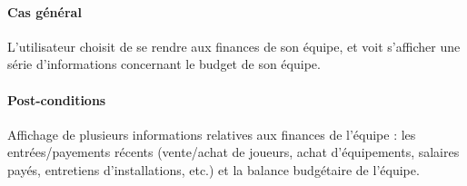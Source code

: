 \paragraph{Cas général}
L'utilisateur choisit de se rendre aux finances de son équipe, et voit s'afficher une série d'informations concernant le budget de son équipe.
\paragraph{Post-conditions}
\begin{list}{}{\leftmargin=1.5em}
\item{Affichage de plusieurs informations relatives aux finances de l'équipe : les entrées/payements récents (vente/achat de joueurs, achat d'équipements, salaires payés, entretiens d'installations, etc.) et la balance budgétaire de l'équipe.}
\end{list}

